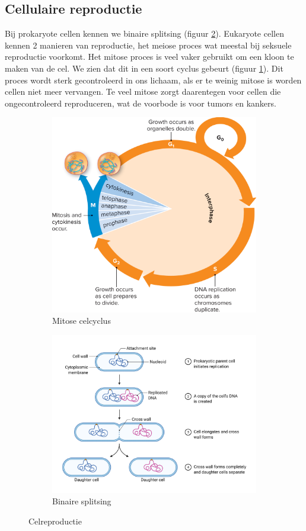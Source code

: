 \documentclass[a4paper,kul]{kulakarticle} %
\begin{document}
\subsection{Cellulaire reproductie}
Bij prokaryote cellen kennen we binaire splitsing (figuur \ref{fig:binairesplitsing}). Eukaryote cellen kennen 2 manieren van reproductie, het meiose proces wat meestal bij seksuele reproductie voorkomt. Het mitose proces is veel vaker gebruikt om een kloon te maken van de cel. We zien dat dit in een soort cyclus gebeurt (figuur \ref{fig:celcyclus}). Dit proces wordt sterk gecontroleerd in ons lichaam, als er te weinig mitose is worden cellen niet meer vervangen. Te veel mitose zorgt daarentegen voor cellen die ongecontroleerd reproduceren, wat de voorbode is voor tumors en kankers.  

\begin{figure}[h]
	\centering
	\begin{subfigure}{.5\textwidth}
		\centering
		\includegraphics[width=0.7\linewidth]{Celcyclus}
		\caption{Mitose celcyclus}
		\label{fig:celcyclus}
	\end{subfigure}%
	\begin{subfigure}{.5\textwidth}
		\centering
		\includegraphics[width=0.7\linewidth]{Binaire_Splitsing}
		\caption[Splitsing]{Binaire splitsing}
		\label{fig:binairesplitsing}
	\end{subfigure}
	\caption{Celreproductie}
	\label{fig:reproductie}
\end{figure}
\end{document}

